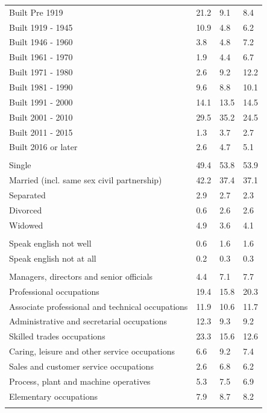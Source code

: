 \documentclass{article}
\begin{document}
\begin{table}[h]
\begin{tabular}{KTTT}
    \hline
Built Pre 1919 & 21.2&  9.1&  8.4\\
Built 1919 - 1945 & 10.9&  4.8&  6.2\\
Built  1946 - 1960 & 3.8& 4.8& 7.2\\
Built  1961 - 1970 & 1.9& 4.4& 6.7\\
Built  1971 - 1980 &  2.6&  9.2& 12.2\\
Built  1981 - 1990 &  9.6&  8.8& 10.1\\
Built  1991 - 2000 & 14.1& 13.5& 14.5\\
Built  2001 - 2010 & 29.5& 35.2& 24.5\\
Built  2011 - 2015 & 1.3& 3.7& 2.7\\
Built  2016 or later & 2.6& 4.7& 5.1\\
\hline
    \\
    \hline
Single & 49.4& 53.8& 53.9\\
Married (incl. same sex civil partnership) & 42.2& 37.4& 37.1\\
Separated  & 2.9& 2.7& 2.3\\
Divorced  & 0.6& 2.6& 2.6\\
Widowed & 4.9& 3.6& 4.1\\
\hline
    \\ 
    \hline
Speak english not well & 0.6& 1.6& 1.6\\
Speak english not at all & 0.2& 0.3& 0.3\\
\hline
    \\
    \hline
Managers, directors and senior officials & 4.4& 7.1& 7.7\\
Professional occupations & 19.4& 15.8& 20.3\\
Associate professional and technical occupations & 11.9& 10.6& 11.7\\
Administrative and secretarial occupations & 12.3&  9.3&  9.2\\
Skilled trades occupations & 23.3& 15.6& 12.6\\
Caring, leisure and other service occupations & 6.6& 9.2& 7.4\\
Sales and customer service occupations & 2.6& 6.8& 6.2\\
Process, plant and machine operatives & 5.3& 7.5& 6.9\\
Elementary occupations & 7.9& 8.7& 8.2\\
\hline
\end{tabular}
\end{table}
\end{document}
